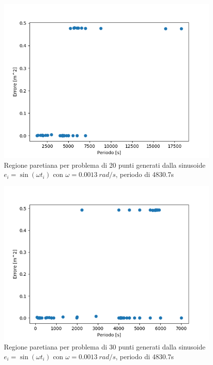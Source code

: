 \documentclass[a4paper,12pt]{report}
\begin{document}
\begin{figure}[H]
  \centering
  \includegraphics[scale=0.67]{img/puls0013/init_20.png}
  \caption{Regione paretiana per problema di 20 punti generati dalla sinusoide \newline $e_i = \sin(\omega t_i)$ con $\omega = 0.0013~rad/s$, periodo di 4830.7s}
  \label{fig:init_0013_20}
\end{figure}

\begin{figure}[H]
  \centering
  \includegraphics[scale=0.70]{img/puls0013/init_30.png}
  \caption{Regione paretiana per problema di 30 punti generati dalla sinusoide \newline $e_i = \sin(\omega t_i)$ con $\omega = 0.0013~rad/s$, periodo di 4830.7s}
  \label{fig:init_0013_30}
\end{figure}
\end{document}
